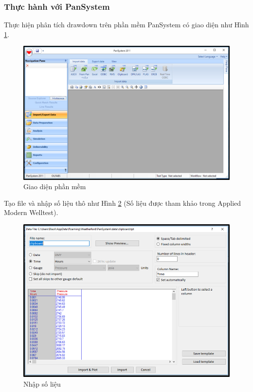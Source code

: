 \documentclass[12pt,a4paper]{report}
\begin{document}
	\subsubsection{Thực hành với PanSystem}
Thực hiện phân tích drawdown trên phần mềm PanSystem có giao diện như Hình \ref{fig:inter_pan}.\\
	\begin{figure}[h]
    	\centering
        \includegraphics[scale=0.6]{welltest/interface.png}
        \caption{Giao diện phần mềm}
        \label{fig:inter_pan}
    \end{figure}
    \newpage
    \noindent
Tạo file và nhập số liệu thô như Hình \ref{fig:input_data_w} (Số liệu được tham khảo trong Applied Modern Welltest).\\
	\begin{figure}[h]
    	\centering
        \includegraphics[scale=0.7]{welltest/input_data.png}
        \caption{Nhập số liệu}
        \label{fig:input_data_w}
    \end{figure}
\end{document}
